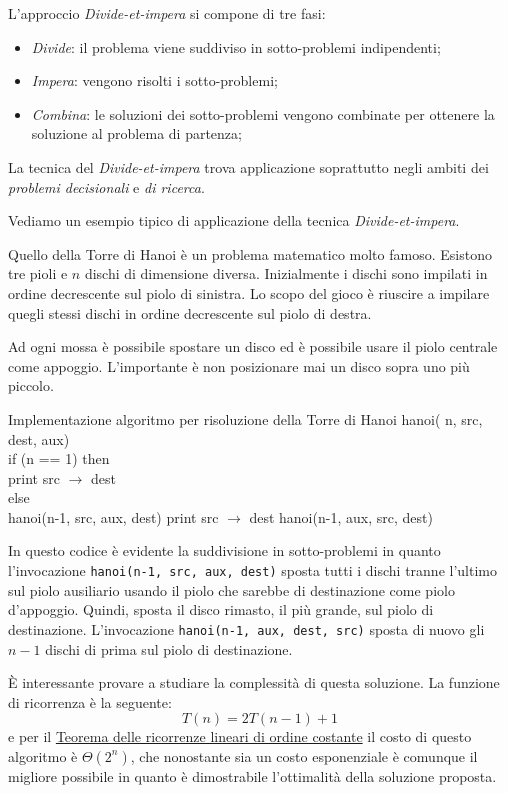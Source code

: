 \bigskip\noindent
L'approccio \emph{Divide-et-impera} si compone di tre fasi:
\begin{itemize}
    \item \emph{Divide}: il problema viene suddiviso in sotto-problemi indipendenti;
    \item \emph{Impera}: vengono risolti i sotto-problemi;
    \item \emph{Combina}: le soluzioni dei sotto-problemi vengono combinate per
    ottenere la soluzione al problema di partenza;
\end{itemize}
\begin{note}
    La tecnica del \emph{Divide-et-impera} trova applicazione soprattutto negli
    ambiti dei \emph{problemi decisionali} e \emph{di ricerca}.
\end{note}\noindent
Vediamo un esempio tipico di applicazione della tecnica
\emph{Divide-et-impera}.
\begin{problem}
    Quello della Torre di Hanoi è un problema matematico molto famoso. Esistono
    tre pioli e $n$ dischi di dimensione diversa. Inizialmente i dischi sono
    impilati in ordine decrescente sul piolo di sinistra. Lo scopo del gioco è
    riuscire a impilare quegli stessi dischi in ordine decrescente sul piolo di
    destra.
    
    Ad ogni mossa è possibile spostare un disco ed è possibile usare il piolo
    centrale come appoggio. L'importante è non posizionare mai un
    disco sopra uno più piccolo.

    \bigskip
\begin{minicode}{Implementazione algoritmo per risoluzione della Torre di Hanoi}
\ind hanoi( n,  src,  dest,  aux)\\
    \indf if (n == 1) then\\
        print src $\to$ dest\\
    \indf else\\
        hanoi(n-1, src, aux, dest)\hfill{}
        print src $\to$ dest\hfill{}
        hanoi(n-1, aux, src, dest)\hfill{}
\end{minicode}\noindent
    In questo codice è evidente la suddivisione in sotto-problemi in quanto
    l'invocazione \texttt{hanoi(n-1, src, aux, dest)} sposta tutti i dischi tranne
    l'ultimo sul piolo ausiliario usando il piolo che sarebbe di destinazione come
    piolo d'appoggio. Quindi, sposta il disco rimasto, il più grande, sul piolo
    di destinazione. L'invocazione \texttt{hanoi(n-1, aux, dest, src)}
    sposta di nuovo gli $n-1$ dischi di prima sul piolo di destinazione.

    \bigskip\noindent È interessante provare a studiare la complessità di questa
    soluzione. La funzione di ricorrenza è la seguente:
    \[T(n)=2T(n-1)+1\]
    e per il \hyperref[def:21]{Teorema delle ricorrenze lineari di ordine costante}
    il costo di questo algoritmo è $\Theta(2^n)$, che nonostante sia un costo
    esponenziale è comunque il migliore possibile in quanto è dimostrabile
    l'ottimalità della soluzione proposta.
\end{problem}

